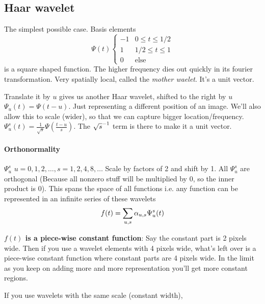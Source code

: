 \subsection{Haar wavelet}
\label{sec:haar-wavelet}
The simplest possible case. Basis elements
$$\Psi(t)
\begin{cases}
  -1 & 0 \le t \le 1/2\\
 1 & 1/2 \le t \le 1\\
0 & \text{else}
\end{cases}
$$ is a square shaped function. The higher frequency dies
out quickly in its fourier transformation. Very spatially local,
called the\emph{ mother waelet}. It's a unit vector.

Translate it by $u$ gives us another Haar wavelet, shifted to the
right by $u$ $\Psi_u(t) = \Psi(t-u)$. Just representing a different
position of an image. We'll also allow this to scale (wider), so that we can
capture bigger location/frequency. $\Psi_u^s(t) =
\frac{1}{\sqrt{s}}\Psi(\frac{t-u}{s})$. The $\sqrt{s}^{-1}$ term is
there to make it a unit vector.

\paragraph{Orthonormality}
\label{sec:orthonormality}
$\Psi_u^s$ $u=0, 1, 2, \dots, s=1,2,4,8, \dots$ Scale by factors of 2
and shift by 1. All $\Psi_u^s$ are orthogonal (Because all nonzero stuff will
be multiplied by 0, so the inner product is 0).
This spans the space of all functions i.e. any function can be
represented in an infinite series of these wavelets
$$f(t) = \sum_{u,s}\alpha_{u,s} \Psi_u^s(t)$$

\textbf{$f(t)$ is a piece-wise constant function}: Say the constant
part is 2 pixels wide. Then if you use a wavelet elements with 4
pixels wide, what's left over is a piece-wise constant function where
constant parts are 4 pixels wide. In the limit as you keep on adding
more and more representation you'll get more constant regions. 

If you use wavelets with the same scale (constant width), 


